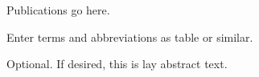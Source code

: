 \documentclass[times,12pt,thesis,online]{uom_thesis_casson} %
\begin{document}




\uomtoc %
\uomlof %
\uomlot %
\begin{uomlop} %
  Publications go here.
\end{uomlop}
\begin{uomterms}
  Enter terms and abbreviations as table or similar.

\end{uomterms}



\begin{abstract} %
  This is abstract text. 
  
  \lipsum[1-2]
\end{abstract}%
\clearpage



\begin{uomlay} %
  Optional. If desired, this is lay abstract text. 
  
  \lipsum[1-2]
\end{uomlay}
\end{document}
